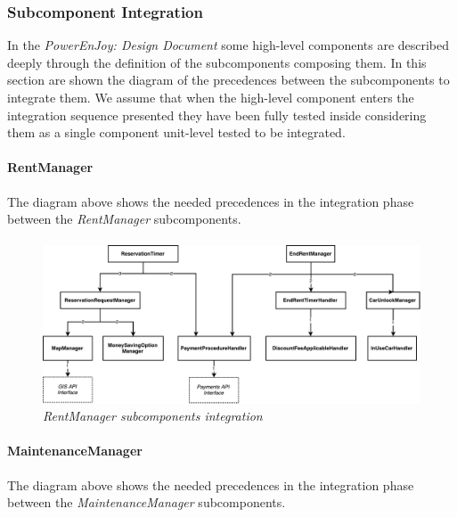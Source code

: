 \clearpage
\subsubsection{Subcomponent Integration}
In the \emph{PowerEnJoy: Design Document}\cite{DD} some high-level components are described deeply through the definition of the subcomponents composing them.
In this section are shown the diagram of the precedences between the subcomponents to integrate them. We assume that when the high-level component enters the integration sequence presented they have been fully tested inside considering them as a single component unit-level tested to be integrated.

\paragraph{RentManager} 
The diagram above shows the needed precedences in the integration phase between the \emph{RentManager} subcomponents.
\paragraph{}

		\begin{figure}[h]
			\centering
			\includegraphics[width=\linewidth]{img/rentManagerIntegration}
			\caption{
				\label{fig:rentManagerIntegration} 
				\emph{RentManager subcomponents integration}
			}
		\end{figure}
		
\paragraph{MaintenanceManager} 
The diagram above shows the needed precedences in the integration phase between the \emph{MaintenanceManager} subcomponents.
\paragraph{}

